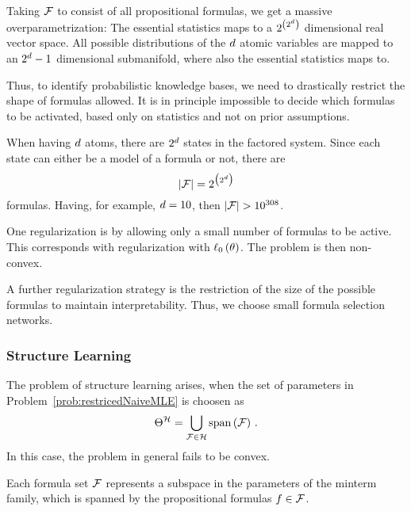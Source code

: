 \begin{remark}[Overparametrization]
	Taking $\mathcal{F}$ to consist of all propositional formulas, we get a massive overparametrization: 
	The essential statistics maps to a $2^{\left(2^d \right)}$ dimensional real vector space.
	All possible distributions of the $d$ atomic variables are mapped to an $2^d-1$ dimensional submanifold, where also the essential statistics maps to.

	Thus, to identify probabilistic knowledge bases, we need to drastically restrict the shape of formulas allowed.
	It is in principle impossible to decide which formulas to be activated, based only on statistics and not on prior assumptions.

	When having $d$ atoms, there are $2^{d}$ states in the factored system.
	Since each state can either be a model of a formula or not, there are
		\[ \left|\mathcal{F}\right| = 2^{\big(2^d \big)} \]
	formulas.
	Having, for example, $d=10$, then $\cardof{\formulaset}>10^{308}$.


	One regularization is by allowing only a small number of formulas to be active.
	This corresponds with regularization with $\ell_0\left(\theta\right)$.
	The problem is then non-convex.


	A further regularization strategy is the restriction of the size of the possible formulas to maintain interpretability. 
	Thus, we choose small formula selection networks.
\end{remark}




\subsubsection{Structure Learning}

The problem of structure learning arises, when the set of parameters in Problem~\ref{prob:restricedNaiveMLE} is choosen as 
	\[ \Theta^{\mathcal{H}}= \bigcup_{\mathcal{F}\in\mathcal{H}} \mathrm{span}\left(\mathcal{F}\right) \, .  \] %
In this case, the problem in general fails to be convex.

Each formula set $\mathcal{F}$ represents a subspace in the parameters of the minterm family, which is spanned by the propositional formulas $f\in\mathcal{F}$.

